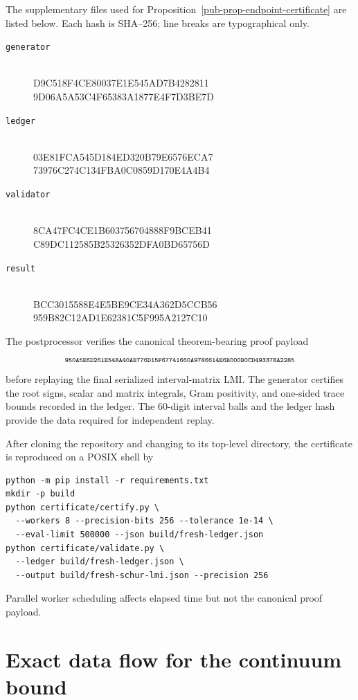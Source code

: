 \documentclass[11pt]{article}
\theoremstyle{remark}
\begin{document}
The supplementary files used for Proposition~\ref{pub-prop-endpoint-certificate} are listed below.
Each hash is SHA--256; line breaks are typographical only.
\begin{description}
\item[\texttt{generator}] \\
{\scriptsize\ttfamily
D9C518F4CE80037E1E545AD7B4282811\allowbreak
9D06A5A53C4F65383A1877E4F7D3BE7D}
\item[\texttt{ledger}] \\
{\scriptsize\ttfamily
03E81FCA545D184ED320B79E6576ECA7\allowbreak
73976C274C134FBA0C0859D170E4A4B4}
\item[\texttt{validator}] \\
{\scriptsize\ttfamily
8CA47FC4CE1B603756704888F9BCEB41\allowbreak
C89DC112585B25326352DFA0BD65756D}
\item[\texttt{result}] \\
{\scriptsize\ttfamily
BCC3015588E4E5BE9CE34A362D5CCB56\allowbreak
959B82C12AD1E62381C5F995A2127C10}
\end{description}
The postprocessor verifies the canonical theorem-bearing proof payload
\[
\text{\scriptsize\ttfamily
950A5E6D261E548A40AB776D15F67741\allowbreak
660A9786614E6B000B0CD493378A2285}
\]
before replaying the final serialized interval-matrix LMI.
The generator certifies the root signs, scalar and matrix integrals, Gram positivity,
and one-sided trace bounds recorded in the ledger.
The 60-digit interval balls and the ledger hash provide the data required for independent replay.

After cloning the repository and changing to its top-level directory,
the certificate is reproduced on a POSIX shell by
\begin{verbatim}
python -m pip install -r requirements.txt
mkdir -p build
python certificate/certify.py \
  --workers 8 --precision-bits 256 --tolerance 1e-14 \
  --eval-limit 500000 --json build/fresh-ledger.json
python certificate/validate.py \
  --ledger build/fresh-ledger.json \
  --output build/fresh-schur-lmi.json --precision 256
\end{verbatim}
Parallel worker scheduling affects elapsed time but not the canonical proof payload.

\section{Exact data flow for the continuum bound}
\label{pub-sec-data-flow}
\end{document}
